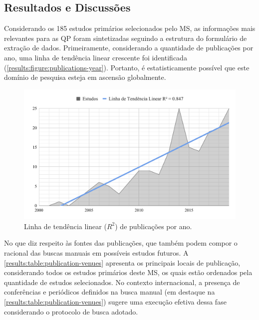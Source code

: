 \subsection{Resultados e Discussões}
\label{ms:resultados}

Considerando os 185 estudos primários selecionados pelo MS, as informações mais relevantes para as QP foram sintetizadas seguindo a estrutura do formulário de extração de dados. Primeiramente, considerando a quantidade de publicações por ano, uma linha de tendência linear crescente foi identificada (\autoref{results:figure:publications-year}). Portanto, é estatisticamente possível que este domínio de pesquisa esteja em ascensão globalmente.

\begin{figure}[htbp]
\caption{Linha de tendência linear ($R^2$) de publicações por ano.}
\label{results:figure:publications-year}
\centerline{\includegraphics[width=1\textwidth]{images/publications-sm-timeline.pdf}}
\end{figure}

No que diz respeito às fontes das publicações, que também podem compor o racional das buscas manuais em possíveis estudos futuros. A \autoref{results:table:publication-venues} apresenta os principais locais de publicação, considerando todos os estudos primários deste MS, os quais estão ordenados pela quantidade de estudos selecionados. No contexto internacional, a presença de conferências e periódicos definidos na busca manual (em destaque na \autoref{results:table:publication-venues}) sugere uma execução efetiva dessa fase considerando o protocolo de busca adotado.

